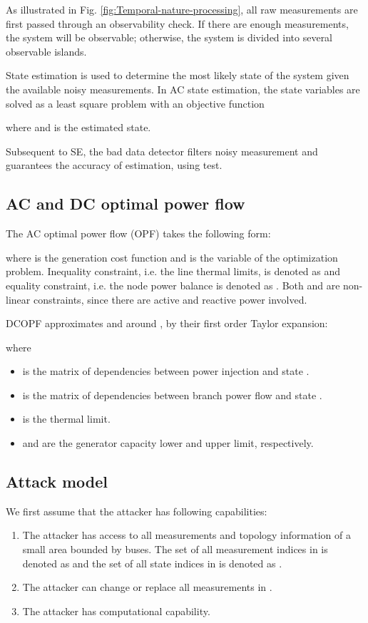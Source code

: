 \documentclass[twocolumn,english,final,journal]{IEEEtran}
\theoremstyle{plain}
\theoremstyle{definition}
\begin{document}
As illustrated in Fig. \ref{fig:Temporal-nature-processing}, all
raw measurements are first passed through an observability check.
If there are enough measurements, the system will be observable; otherwise,
the system is divided into several observable islands.

State estimation is used to determine the most likely state of the
system given the available noisy measurements. In AC state estimation,
the state variables are solved as a least square problem with an objective
function 

where 
and  is the estimated
state.

Subsequent to SE, the bad data detector filters noisy measurement and guarantees the
accuracy of estimation, using  test.
\subsection{AC and DC optimal power flow}

The AC optimal power flow (OPF) takes the following form:

 where  is the generation cost function and  is the  variable of the optimization problem. Inequality constraint,
i.e. the line thermal limits, is denoted as  and equality constraint,
i.e. the node power balance is denoted as . Both  and 
are non-linear constraints, since there are active and reactive power
involved.

DCOPF approximates  and  around ,  by their first order Taylor
expansion:

where
\begin{itemize}
\item  is the matrix of dependencies between power injection  and
state .
\item  is the matrix of dependencies between branch power flow and
state .
\item  is the thermal limit.
\item and  are the generator capacity lower
and upper limit, respectively.
\end{itemize}

\subsection{Attack model\label{sub:attack-model}}

We first assume that the attacker has following capabilities:
\begin{enumerate} 
\item The attacker has access to all measurements and topology information of a small area  bounded by buses. The set of all measurement indices in  is denoted as  and the set of all state indices in  is denoted as . 
\item The attacker can change or replace all measurements in . 
\item The attacker has computational capability.  
\end{enumerate}
\end{document}
